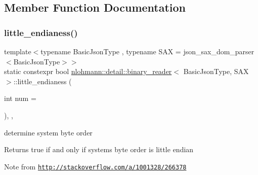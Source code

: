 \subsection{Member Function Documentation}
\mbox{\label{classnlohmann_1_1detail_1_1binary__reader_a1e31dbfcf9567c8c2d4f0e4eb1b0230a}} 
\subsubsection{\texorpdfstring{little\+\_\+endianess()}{little\_endianess()}}
{\footnotesize\ttfamily template$<$typename Basic\+Json\+Type , typename S\+AX  = json\+\_\+sax\+\_\+dom\+\_\+parser$<$\+Basic\+Json\+Type$>$$>$ \\
static constexpr bool \hyperlink{classnlohmann_1_1detail_1_1binary__reader}{nlohmann\+::detail\+::binary\+\_\+reader}$<$ Basic\+Json\+Type, S\+AX $>$\+::little\+\_\+endianess (\begin{DoxyParamCaption}\item[{int}]{num = {} }\end{DoxyParamCaption})\hspace{0.3cm}{\ttfamily [inline]}, {\ttfamily [static]}, {\ttfamily [noexcept]}}



determine system byte order 

\begin{DoxyReturn}{Returns}
true if and only if system\textquotesingle{}s byte order is little endian
\end{DoxyReturn}
\begin{DoxyNote}{Note}
from \href{http://stackoverflow.com/a/1001328/266378}{\tt http\+://stackoverflow.\+com/a/1001328/266378} 
\end{DoxyNote}
\mbox{\label{classnlohmann_1_1detail_1_1binary__reader_ab94a54d6e595c2620b07589cf4116256}} 
